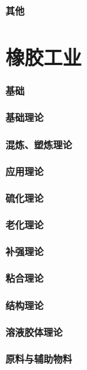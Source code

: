 \documentclass[UTF8]{../../ApplicationUniverse}
\begin{document}
    \subsubsection{其他}












\chapter{橡胶工业}
\subsubsection{基础}
    \subsubsection{基础理论}
        \subsubsection{混炼、塑炼理论}
        \subsubsection{应用理论}
        \subsubsection{硫化理论}
        \subsubsection{老化理论}
        \subsubsection{补强理论}
        \subsubsection{粘合理论}
        \subsubsection{结构理论}
        \subsubsection{溶液胶体理论}
    \subsubsection{原料与辅助物料}
\end{document}
